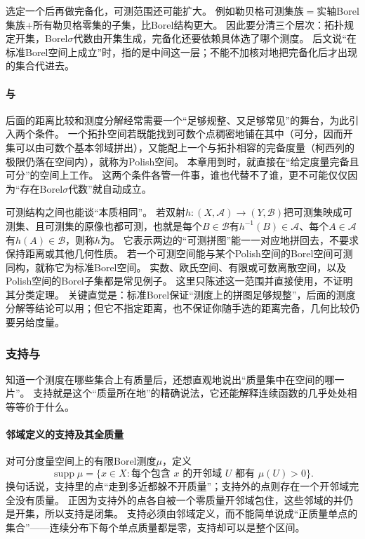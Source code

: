 选定一个后再做完备化，可测范围还可能扩大。
例如勒贝格可测集族$=$实轴Borel集族$+$所有勒贝格零集的子集，比Borel结构更大。
因此要分清三个层次：拓扑规定开集，Borel$\sigma$代数由开集生成，完备化还要依赖具体选了哪个测度。
后文说“在标准Borel空间上成立”时，指的是中间这一层；不能不加核对地把完备化后才出现的集合代进去。

\paragraph{与}

后面的距离比较和测度分解经常需要一个“足够规整、又足够常见”的舞台，为此引入两个条件。
一个拓扑空间若既能找到可数个点稠密地铺在其中（可分，因而开集可以由可数个基本邻域拼出），又能配上一个与拓扑相容的完备度量（柯西列的极限仍落在空间内），就称为Polish空间。
本章用到时，就直接在“给定度量完备且可分”的空间上工作。
这两个条件各管一件事，谁也代替不了谁，更不可能仅仅因为“存在Borel$\sigma$代数”就自动成立。

可测结构之间也能谈“本质相同”。
若双射$h:(X,\mathcal A)\to(Y,\mathcal B)$把可测集映成可测集、且可测集的原像也都可测，也就是每个$B\in\mathcal B$有$h^{-1}(B)\in\mathcal A$、每个$A\in\mathcal A$有$h(A)\in\mathcal B$，则称$h$为。
它表示两边的“可测拼图”能一一对应地拼回去，不要求保持距离或其他几何性质。
若一个可测空间能与某个Polish空间的Borel空间可测同构，就称它为标准Borel空间。
实数、欧氏空间、有限或可数离散空间，以及Polish空间的Borel子集都是常见例子。
这里只陈述这一范围并直接使用，不证明其分类定理。
关键直觉是：标准Borel保证“测度上的拼图足够规整”，后面的测度分解等结论可以用；但它不指定距离，也不保证你随手选的距离完备，几何比较仍要另给度量。

\subsubsection{支持与}

知道一个测度在哪些集合上有质量后，还想直观地说出“质量集中在空间的哪一片”。
支持就是这个“质量所在地”的精确说法，它还能解释连续函数的几乎处处相等等价于什么。

\paragraph{邻域定义的支持及其全质量}

对可分度量空间上的有限Borel测度$\mu$，定义
\[
 \operatorname{supp}\mu
  =\{x\in X:\text{每个包含 }x\text{ 的开邻域 }U\text{ 都有 }\mu(U)>0\}.
\]
换句话说，支持里的点“走到多近都躲不开质量”；支持外的点则存在一个开邻域完全没有质量。
正因为支持外的点各自被一个零质量开邻域包住，这些邻域的并仍是开集，所以支持是闭集。
支持必须由邻域定义，而不能简单说成“正质量单点的集合”——连续分布下每个单点质量都是零，支持却可以是整个区间。

